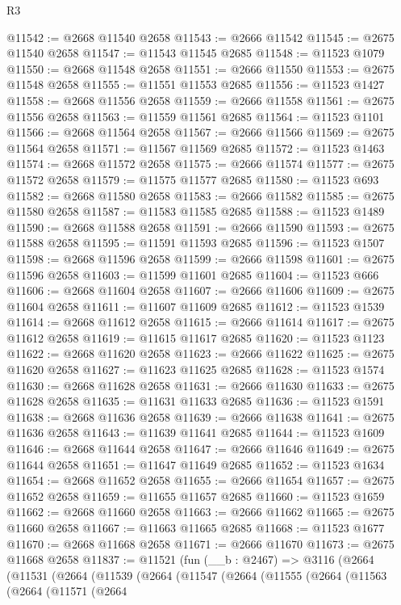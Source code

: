 \begin{lexlean}{R3}
\begin{coremodule}
@11542 := @2668 @11540 @2658
@11543 := @2666 @11542
@11545 := @2675 @11540 @2658
@11547 := @11543 @11545 @2685
@11548 := @11523 @1079
@11550 := @2668 @11548 @2658
@11551 := @2666 @11550
@11553 := @2675 @11548 @2658
@11555 := @11551 @11553 @2685
@11556 := @11523 @1427
@11558 := @2668 @11556 @2658
@11559 := @2666 @11558
@11561 := @2675 @11556 @2658
@11563 := @11559 @11561 @2685
@11564 := @11523 @1101
@11566 := @2668 @11564 @2658
@11567 := @2666 @11566
@11569 := @2675 @11564 @2658
@11571 := @11567 @11569 @2685
@11572 := @11523 @1463
@11574 := @2668 @11572 @2658
@11575 := @2666 @11574
@11577 := @2675 @11572 @2658
@11579 := @11575 @11577 @2685
@11580 := @11523 @693
@11582 := @2668 @11580 @2658
@11583 := @2666 @11582
@11585 := @2675 @11580 @2658
@11587 := @11583 @11585 @2685
@11588 := @11523 @1489
@11590 := @2668 @11588 @2658
@11591 := @2666 @11590
@11593 := @2675 @11588 @2658
@11595 := @11591 @11593 @2685
@11596 := @11523 @1507
@11598 := @2668 @11596 @2658
@11599 := @2666 @11598
@11601 := @2675 @11596 @2658
@11603 := @11599 @11601 @2685
@11604 := @11523 @666
@11606 := @2668 @11604 @2658
@11607 := @2666 @11606
@11609 := @2675 @11604 @2658
@11611 := @11607 @11609 @2685
@11612 := @11523 @1539
@11614 := @2668 @11612 @2658
@11615 := @2666 @11614
@11617 := @2675 @11612 @2658
@11619 := @11615 @11617 @2685
@11620 := @11523 @1123
@11622 := @2668 @11620 @2658
@11623 := @2666 @11622
@11625 := @2675 @11620 @2658
@11627 := @11623 @11625 @2685
@11628 := @11523 @1574
@11630 := @2668 @11628 @2658
@11631 := @2666 @11630
@11633 := @2675 @11628 @2658
@11635 := @11631 @11633 @2685
@11636 := @11523 @1591
@11638 := @2668 @11636 @2658
@11639 := @2666 @11638
@11641 := @2675 @11636 @2658
@11643 := @11639 @11641 @2685
@11644 := @11523 @1609
@11646 := @2668 @11644 @2658
@11647 := @2666 @11646
@11649 := @2675 @11644 @2658
@11651 := @11647 @11649 @2685
@11652 := @11523 @1634
@11654 := @2668 @11652 @2658
@11655 := @2666 @11654
@11657 := @2675 @11652 @2658
@11659 := @11655 @11657 @2685
@11660 := @11523 @1659
@11662 := @2668 @11660 @2658
@11663 := @2666 @11662
@11665 := @2675 @11660 @2658
@11667 := @11663 @11665 @2685
@11668 := @11523 @1677
@11670 := @2668 @11668 @2658
@11671 := @2666 @11670
@11673 := @2675 @11668 @2658
@11837 := @11521
    (fun (__b : @2467) =>
    @3116
      (@2664
        (@11531
          (@2664
            (@11539
              (@2664
                (@11547
                  (@2664
                    (@11555
                      (@2664
                        (@11563
                          (@2664
                            (@11571
                              (@2664

\end{coremodule}
\end{lexlean}
